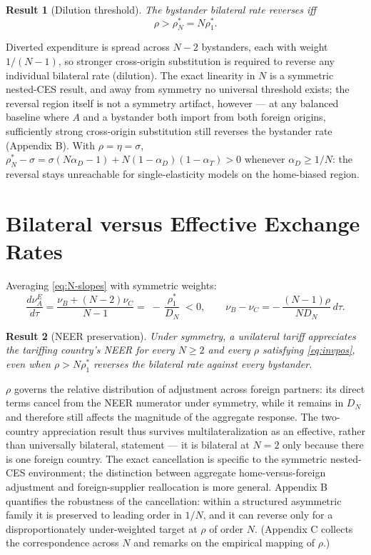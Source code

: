 \documentclass[11pt]{article}
\newtheorem{result}{Result}[section]
\begin{document}
\begin{result}[Dilution threshold]
The bystander bilateral rate reverses iff
\begin{equation}
\boxed{\;\rho > \rho_N^* = N \rho_1^* . \;}
\end{equation}
\label{res:Nthresh}
\end{result}

\noindent Diverted expenditure is spread across $N-2$ bystanders, each with weight $1/(N-1)$, so stronger cross-origin substitution is required to reverse any individual bilateral rate (dilution). The exact linearity in $N$ is a symmetric nested-CES result, and away from symmetry no universal threshold exists; the reversal region itself is not a symmetry artifact, however --- at any balanced baseline where $A$ and a bystander both import from both foreign origins, sufficiently strong cross-origin substitution still reverses the bystander rate (Appendix B). With $\rho = \eta = \sigma$, $\rho_N^* - \sigma = \sigma(N\alpha_D - 1) + N(1-\alpha_D)(1-\alpha_T) > 0$ whenever $\alpha_D \geq 1/N$: the reversal stays unreachable for single-elasticity models on the home-biased region.

\section{Bilateral versus Effective Exchange Rates}

Averaging \eqref{eq:N-slopes} with symmetric weights:
\begin{equation}
\frac{d\nu_A^E}{d\tau}
= \frac{\nu_B + (N-2)\nu_C}{N-1}
= \boxed{\; -\,\frac{\rho_1^*}{D_N} \;} < 0,
\qquad
\nu_B - \nu_C = -\,\frac{(N-1)\rho}{N D_N}\, d\tau .
\label{eq:N-neer}
\end{equation}

\begin{result}[NEER preservation]
Under symmetry, a unilateral tariff appreciates the tariffing country's NEER for every $N \geq 2$ and every $\rho$ satisfying \eqref{eq:invpos}, even when $\rho > N\rho_1^*$ reverses the bilateral rate against every bystander.
\label{res:neer}
\end{result}

\noindent $\rho$ governs the relative distribution of adjustment across foreign partners: its direct terms cancel from the NEER numerator under symmetry, while it remains in $D_N$ and therefore still affects the magnitude of the aggregate response. The two-country appreciation result thus survives multilateralization as an effective, rather than universally bilateral, statement --- it is bilateral at $N = 2$ only because there is one foreign country. The exact cancellation is specific to the symmetric nested-CES environment; the distinction between aggregate home-versus-foreign adjustment and foreign-supplier reallocation is more general. Appendix B quantifies the robustness of the cancellation: within a structured asymmetric family it is preserved to leading order in $1/N$, and it can reverse only for a disproportionately under-weighted target at $\rho$ of order $N$. (Appendix C collects the correspondence across $N$ and remarks on the empirical mapping of $\rho$.)
\end{document}
